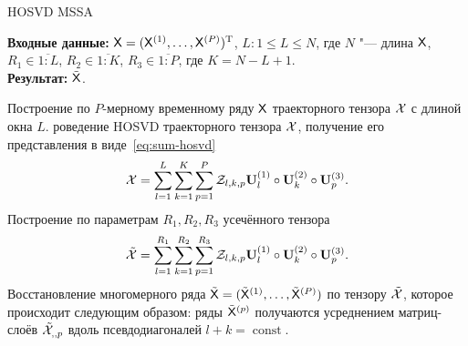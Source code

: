 \documentclass[specialist,
    substylefile = spbu_report.rtx,
    subf,href,colorlinks=true, 12pt]{disser}
\theoremstyle{plain}
\theoremstyle{definition}
\theoremstyle{remark}
\newcommand{\Input}{\textbf{Входные данные: }}
\newcommand{\Output}{\textbf{Результат: }}
\begin{document}
    \begin{algorithm}
        \caption{HOSVD MSSA}
        \label{alg:hosvd-mssa}
        \Input $\mathsf{X} = (\mathsf{X}^{(1)}, \ldots, \mathsf{X}^{(P)})^{\mathrm{T}}$,
        $L: 1\leqslant L \leqslant N$, где $N$ "--- длина $\mathsf{X}$, $R_1 \in \overline{1:L}$,
        $R_2 \in \overline{1:K}$, $R_3 \in \overline{1:P}$, где $K = N-L+1$.\\
        \Output $\tilde{\mathsf{X}}$.\\
        \begin{algorithmic}[1]
            \State Построение по $P$-мерному временному ряду $\mathsf{X}$ траекторного тензора $\mathcal{X}$ с длиной окна $L$.
            \State роведение HOSVD траекторного тензора $\mathcal{X}$, получение его представления в виде~\eqref{eq:sum-hosvd}
            \begin{equation}
                \mathcal{X} = \sum_{l=1}^{L} \sum_{k=1}^{K} \sum_{p=1}^{P} \mathcal{Z}_{l,k,p} \mathbf{U}_l^{(1)}\circ \mathbf{U}_k^{(2)} \circ \mathbf{U}_p^{(3)}.
                \label{eq:hosvd-mssa}
            \end{equation}
            \State Построение по параметрам $R_1, R_2, R_3$ усечённого тензора
            \[
                \tilde{\mathcal{X}}=\sum_{l=1}^{R_1} \sum_{k=1}^{R_2} \sum_{p=1}^{R_3} \mathcal{Z}_{l,k,p} \mathbf{U}_l^{(1)}\circ \mathbf{U}_k^{(2)} \circ \mathbf{U}_p^{(3)}.
            \]
            \State Восстановление многомерного ряда $\tilde{\mathsf{X}}=(\tilde{\mathsf{X}}^{(1)}, \ldots, \tilde{\mathsf{X}}^{(P)})$ по тензору
            $\tilde{\mathcal{X}}$, которое происходит следующим образом:
            ряды $\tilde{\mathsf{X}}^{(p)}$ получаются усреднением матриц-слоёв $\tilde{\mathcal{X}}_{,,p}$ вдоль
            псевдодиагоналей $l+k=\operatorname{const}$.
        \end{algorithmic}
    \end{algorithm}
\end{document}
